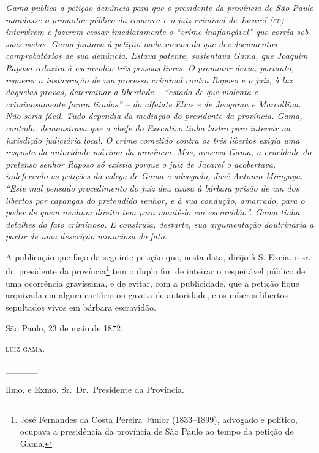 \begin{didascalia}
\emph{Gama publica a petição-denúncia para que o presidente da província
de São Paulo mandasse o promotor público da comarca e o juiz criminal de
Jacareí (\textsc{sp}) intervirem e fazerem cessar imediatamente o ``crime
inafiançável'' que corria sob suas vistas. Gama juntava à petição nada
menos do que dez documentos comprobatórios de sua denúncia. Estava
patente, sustentava Gama, que Joaquim Raposo reduzira à escravidão três
pessoas livres. O promotor devia, portanto, requerer a instauração de um
processo criminal contra Raposo e o juiz, à luz daquelas provas,
determinar a liberdade -- ``estado de que violenta e criminosamente foram
tirados'' -- do alfaiate Elias e de Joaquina e Marcollina. Não seria
fácil. Tudo dependia da mediação do presidente da província. Gama,
contudo, demonstrava que o chefe do Executivo tinha lastro para intervir
na jurisdição judiciária local. O crime cometido contra os três libertos
exigia uma resposta da autoridade máxima da província. Mas, avisava
Gama, a crueldade do pretenso senhor Raposo só existia porque o juiz de
Jacareí o acobertava, indeferindo as petições do colega de Gama e
advogado, José Antonio Miragaya. ``Este mal pensado procedimento do juiz
deu causa à bárbara prisão de um dos libertos por capangas do pretendido
senhor, e à sua condução, amarrado, para o poder de quem nenhum direito
tem para mantê-lo em escravidão''. Gama tinha detalhes do fato criminoso.
E construía, destarte, sua argumentação doutrinária a partir de uma
descrição minuciosa do fato.}
\end{didascalia}

A publicação que faço da seguinte petição que, nesta data, dirijo à S.
Excia. o sr. dr. presidente da província\footnote{ José Fernandes da
  Costa Pereira Júnior (1833--1899), advogado e político, ocupava a
  presidência da província de São Paulo ao tempo da petição de Gama.}
tem o duplo fim de inteirar o respeitável público de uma ocorrência
gravíssima, e de evitar, com a publicidade, que a petição fique
arquivada em algum cartório ou gaveta de autoridade, e os míseros
libertos sepultados vivos em bárbara escravidão.

São Paulo, 23 de maio de 1872.

\textsc{luiz gama}.

\_\_\_\_\_

Ilmo. e Exmo. Sr.~Dr.~Presidente da Província.

